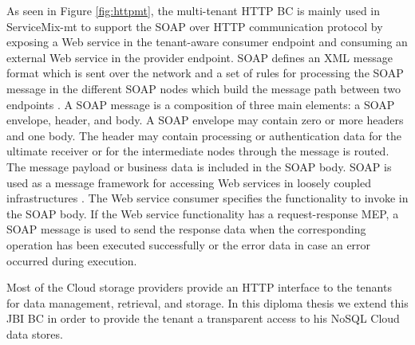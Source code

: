 As seen in Figure \ref{fig:httpmt}, the multi-tenant \ac{HTTP} \ac{BC} is mainly used in ServiceMix-mt to support the \ac{SOAP} over \ac{HTTP} communication protocol by exposing a Web service in the tenant-aware consumer endpoint and consuming an external Web service in the provider endpoint. \ac{SOAP} defines an \ac{XML} message format  which is sent over the network and a set of rules for processing the \ac{SOAP} message in the different \ac{SOAP} nodes which build the message path between two endpoints \cite{Weera2005}. A \ac{SOAP} message is a composition of three main elements: a SOAP envelope, header, and body. A SOAP envelope may contain zero or more headers and one body. The header may contain processing or authentication data for the ultimate receiver or for the intermediate nodes through the message is routed. The message payload or business data is included in the SOAP body. SOAP is used as a message framework for accessing Web services in loosely coupled infrastructures \cite{Weera2005}. The Web service consumer specifies the functionality to invoke in the SOAP body. If the Web service functionality has a request-response \ac{MEP}, a SOAP message is used to send the response data when the corresponding operation has been executed successfully or the error data in case an error occurred during execution.

Most of the Cloud storage providers provide an \ac{HTTP} interface to the tenants for data management, retrieval, and storage. In this diploma thesis we extend this \ac{JBI} \ac{BC} in order to provide the tenant a transparent access to his \ac{NoSQL} Cloud data stores.

\FloatBarrier
